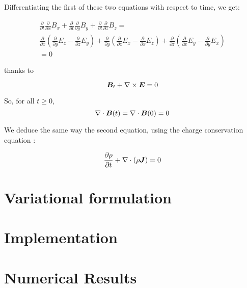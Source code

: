 Differentiating the first of these two equations with respect to time,
we get:


\begin{multline}
  \label{eq:6}
\frac{\partial}{\partial t}\frac{\partial}{\partial
x}B_{x}+\frac{\partial}{\partial t}\frac{\partial}{\partial y}B_{y}+\frac{\partial}{\partial t}\frac{\partial}{\partial z}B_{z} = \\
\frac{\partial}{\partial x}\left(\frac{\partial}{\partial y}E_{z}-\frac{\partial}{\partial z}E_{y}\right)+\frac{\partial}{\partial y}\left(\frac{\partial}{\partial z}E_{x}-\frac{\partial}{\partial x}E_{z}\right)+\frac{\partial}{\partial z}\left(\frac{\partial}{\partial x}E_{y}-\frac{\partial}{\partial y}E_{x}\right)\\
 =  0
\end{multline}



thanks to

\begin{equation}
  \label{eq:3}
  {\bm B}_{t}+\nabla\times {\bm E}=0
\end{equation}



So, for all $t\geq0$,
\begin{equation}
  \label{eq:4}
  \nabla \cdot {\bm B}(t)=\nabla\cdot{\bm B}(0)=0
\end{equation}

We deduce the same way the second equation, using the charge
conservation equation :


\begin{equation}
  \label{eq:2}
  \frac{\partial \rho}{\partial t} + \nabla \cdot  (\rho {\bm J}) = 0
\end{equation}



\section{Variational formulation}
\label{sec:vari-form}

\section{Implementation}
\label{sec:implementation}

\section{Numerical Results}
\label{sec:numerical-results}



